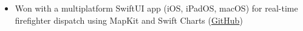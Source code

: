 
\begin{itemize}
    \item Won with a multiplatform SwiftUI app (iOS, iPadOS, macOS) for real-time firefighter dispatch using MapKit and Swift Charts (\href{https://github.com/alireza12t/ConUHack2025-Quebec-Firefighters-iOS-App}{GitHub})
\end{itemize}
